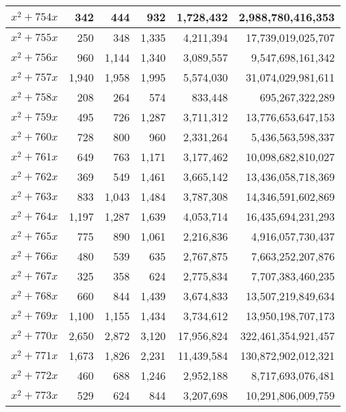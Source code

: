 \documentclass[a4paper]{amsproc}
\theoremstyle{plain}
\begin{document}
\begin{longtable}{ | l | r | r | r | r | r | }
$x^2 + 754x$ & 342 & 444 & 932 & 1{,}728{,}432 & 2{,}988{,}780{,}416{,}353 \\ \hline
$x^2 + 755x$ & 250 & 348 & 1{,}335 & 4{,}211{,}394 & 17{,}739{,}019{,}025{,}707 \\ \hline
$x^2 + 756x$ & 960 & 1{,}144 & 1{,}340 & 3{,}089{,}557 & 9{,}547{,}698{,}161{,}342 \\ \hline
$x^2 + 757x$ & 1{,}940 & 1{,}958 & 1{,}995 & 5{,}574{,}030 & 31{,}074{,}029{,}981{,}611 \\ \hline
$x^2 + 758x$ & 208 & 264 & 574 & 833{,}448 & 695{,}267{,}322{,}289 \\ \hline
$x^2 + 759x$ & 495 & 726 & 1{,}287 & 3{,}711{,}312 & 13{,}776{,}653{,}647{,}153 \\ \hline
$x^2 + 760x$ & 728 & 800 & 960 & 2{,}331{,}264 & 5{,}436{,}563{,}598{,}337 \\ \hline
$x^2 + 761x$ & 649 & 763 & 1{,}171 & 3{,}177{,}462 & 10{,}098{,}682{,}810{,}027 \\ \hline
$x^2 + 762x$ & 369 & 549 & 1{,}461 & 3{,}665{,}142 & 13{,}436{,}058{,}718{,}369 \\ \hline
$x^2 + 763x$ & 833 & 1{,}043 & 1{,}484 & 3{,}787{,}308 & 14{,}346{,}591{,}602{,}869 \\ \hline
$x^2 + 764x$ & 1{,}197 & 1{,}287 & 1{,}639 & 4{,}053{,}714 & 16{,}435{,}694{,}231{,}293 \\ \hline
$x^2 + 765x$ & 775 & 890 & 1{,}061 & 2{,}216{,}836 & 4{,}916{,}057{,}730{,}437 \\ \hline
$x^2 + 766x$ & 480 & 539 & 635 & 2{,}767{,}875 & 7{,}663{,}252{,}207{,}876 \\ \hline
$x^2 + 767x$ & 325 & 358 & 624 & 2{,}775{,}834 & 7{,}707{,}383{,}460{,}235 \\ \hline
$x^2 + 768x$ & 660 & 844 & 1{,}439 & 3{,}674{,}833 & 13{,}507{,}219{,}849{,}634 \\ \hline
$x^2 + 769x$ & 1{,}100 & 1{,}155 & 1{,}434 & 3{,}734{,}612 & 13{,}950{,}198{,}707{,}173 \\ \hline
$x^2 + 770x$ & 2{,}650 & 2{,}872 & 3{,}120 & 17{,}956{,}824 & 322{,}461{,}354{,}921{,}457 \\ \hline
$x^2 + 771x$ & 1{,}673 & 1{,}826 & 2{,}231 & 11{,}439{,}584 & 130{,}872{,}902{,}012{,}321 \\ \hline
$x^2 + 772x$ & 460 & 688 & 1{,}246 & 2{,}952{,}188 & 8{,}717{,}693{,}076{,}481 \\ \hline
$x^2 + 773x$ & 529 & 624 & 844 & 3{,}207{,}698 & 10{,}291{,}806{,}009{,}759 \\ \hline

\end{longtable}
\end{document}
